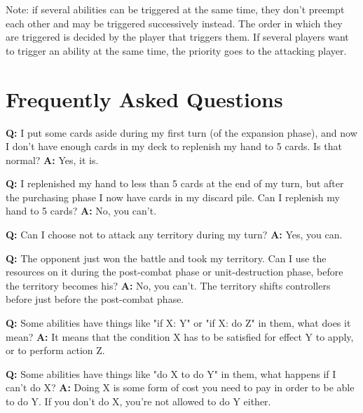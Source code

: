 \documentclass[a4paper]{article}
\begin{document}
    Note: if several abilities can be triggered at the same time,
    they don't preempt each other and may be triggered successively instead.
    The order in which they are triggered is decided by the player that triggers them.
    If several players want to trigger an ability at the same time,
    the priority goes to the attacking player.
    
    
\newpage
\section{Frequently Asked Questions}

    \hspace{-2em}
    \textbf{Q:} I put some cards aside during my first turn (of the expansion phase),
    and now I don't have enough cards in my deck to replenish my hand to 5 cards.
    Is that normal?
    \newline
    \textbf{A:} Yes, it is.

    \hspace{-2em}
    \textbf{Q:} I replenished my hand to less than 5 cards at the end of my turn,
    but after the purchasing phase I now have cards in my discard pile.
    Can I replenish my hand to 5 cards?
    \newline
    \textbf{A:} No, you can't.

    \hspace{-2em}
    \textbf{Q:} Can I choose not to attack any territory during my turn?
    \newline
    \textbf{A:} Yes, you can.

    \hspace{-2em}
    \textbf{Q:} The opponent just won the battle and took my territory.
    Can I use the resources on it during the post-combat phase
    or unit-destruction phase, before the territory becomes his?
    \newline
    \textbf{A:} No, you can't. The territory shifts controllers before just
    before the post-combat phase.

    \hspace{-2em}
    \textbf{Q:} Some abilities have things like "if X: Y" or "if X: do Z" in them,
     what does it mean?
    \newline
    \textbf{A:} It means that the condition X has to be satisfied for effect Y to apply,
    or to perform action Z.

    \hspace{-2em}
    \textbf{Q:} Some abilities have things like "do X to do Y" in them,
    what happens if I can't do X?
    \newline
    \textbf{A:} Doing X is some form of cost you need to pay in order to be able to
    do Y. If you don't do X, you're not allowed to do Y either.
\end{document}
